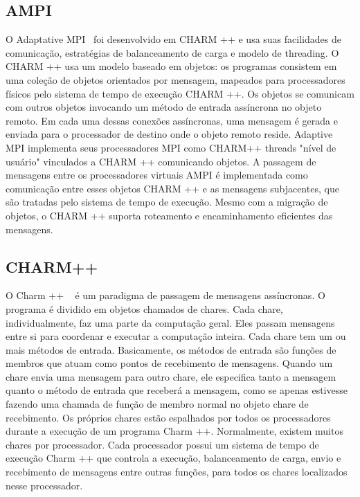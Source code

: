 \subsection{AMPI}	
\label{ampi}
O  Adaptative MPI~\cite{huang2003adaptive} foi desenvolvido em CHARM ++ e usa suas facilidades de comunicação, estratégias de balanceamento de carga e modelo de threading.
O CHARM ++ usa um modelo baseado em objetos: os programas consistem em uma coleção de objetos orientados por mensagem, mapeados para processadores físicos pelo sistema de tempo de execução CHARM ++. Os objetos se comunicam com outros objetos invocando um método de entrada assíncrona no objeto remoto. Em cada uma dessas conexões assíncronas, uma mensagem é gerada e enviada para o processador de destino onde o objeto remoto reside. Adaptive MPI implementa seus processadores MPI como CHARM++ threads "nível de usuário" vinculados a CHARM ++ comunicando objetos.
A passagem de mensagens entre os processadores virtuais AMPI é implementada como comunicação entre esses objetos CHARM ++ e as mensagens subjacentes, que são tratadas pelo sistema de tempo de execução. Mesmo com a migração de objetos, o CHARM ++ suporta roteamento e encaminhamento eficientes das mensagens.

\subsection{CHARM++}
\label{charm-subsection}
O Charm ++ ~\cite{kunzman2006charm++} é um paradigma de passagem de mensagens assíncronas. O programa é dividido em objetos chamados de chares. Cada chare, individualmente, faz uma parte da computação geral. Eles passam mensagens entre si para coordenar e executar a computação inteira. Cada chare tem um ou mais métodos de entrada. Basicamente, os métodos de entrada são funções de membros que atuam como pontos de recebimento de mensagens. Quando um chare envia uma mensagem para outro chare, ele especifica tanto a mensagem quanto o método de entrada que receberá a mensagem, como se apenas estivesse fazendo uma chamada de função de membro normal no objeto chare de recebimento. Os próprios chares estão espalhados por todos os processadores durante a execução de um programa Charm ++. Normalmente, existem muitos chares por processador. Cada processador possui um sistema de tempo de execução Charm ++ que controla a execução, balanceamento de carga, envio e recebimento de mensagens entre outras funções, para todos os chares localizados nesse processador.
